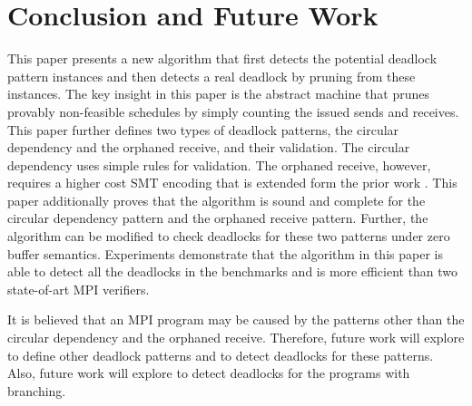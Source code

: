 \section{Conclusion and Future Work}
This paper presents a new algorithm that first detects the potential deadlock pattern instances and then detects a real deadlock by pruning from these instances.
The key insight in this paper is the abstract machine that prunes provably non-feasible schedules by simply counting the issued sends and receives. 
This paper further defines two types of deadlock patterns, the circular dependency and the orphaned receive, and their validation. The circular dependency uses simple rules for validation. The orphaned receive, however, requires a higher cost SMT encoding that is extended form the prior work \cite{DBLP:conf/kbse/HuangMM13}. This paper additionally proves that the algorithm is sound and complete for the circular dependency pattern and the orphaned receive pattern.
Further, the algorithm can be modified to check deadlocks for these two patterns under zero buffer semantics. Experiments demonstrate that the algorithm in this paper is able to detect all the deadlocks in the benchmarks and is more efficient than two state-of-art MPI verifiers.

It is believed that an MPI program may be caused by the patterns other than the circular dependency and the orphaned receive. Therefore, future work will explore to define other deadlock patterns and to detect deadlocks for these patterns. Also, future work will explore to detect deadlocks for the programs with branching. 

\newpage
